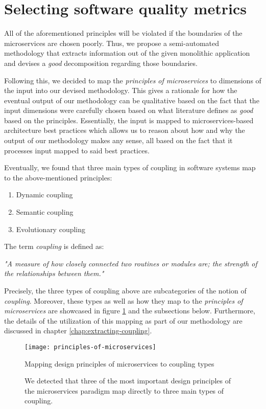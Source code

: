 \documentclass[12pt,a4paper]{report}
\begin{document}
\section{Selecting software quality metrics} \label{sect:software-quality-metrics}

All of the aforementioned principles will be violated if the boundaries of the
microservices are chosen poorly. Thus, we propose a semi-automated methodology
that extracts information out of the given monolithic application and devises
a \textit{good} decomposition regarding those boundaries.

Following this, we decided to map the \textit{principles of microservices} to
dimensions of the input into our devised methodology.
This gives a rationale for how the eventual output of our methodology can
be qualitative based on the fact that the input dimensions were carefully
chosen based on what literature defines as \textit{good} based on the principles.
Essentially, the input is mapped to microservices-based architecture best practices
which allows us to reason about how and why the output of our methodology
makes any sense, all based on the fact that it processes input mapped to said
best practices.

Eventually, we found that three main types of coupling in software systems map
to the above-mentioned principles:
\begin{enumerate}
  \item Dynamic coupling
  \item Semantic coupling
  \item Evolutionary coupling
\end{enumerate}
The term \textit{coupling} is defined as:
\begin{displayquote}
\emph{"A measure of how closely connected two routines or modules are;
the strength of the relationships between them."}~\cite{swebok}
\end{displayquote}
Precisely, the three types of coupling above are subcategories of the notion of
\textit{coupling}. Moreover, these types as well as how they map to the
\textit{principles of microservices} are showcased in figure
\ref{fig:principles-of-microservices} and the subsections below.
Furthermore, the details of the utilization
of this mapping as part of our methodology are discussed in chapter
\ref{chap:extracting-coupling}.

\begin{figure}[htbp]
\centering
\texttt{[image: principles-of-microservices]}
\caption{Mapping design principles of microservices to coupling types}
\caption*{\centering
  We detected that three of the most important design principles of the
  microservices paradigm map directly to three main types of coupling.
}
\label{fig:principles-of-microservices}
\end{figure}
\end{document}

